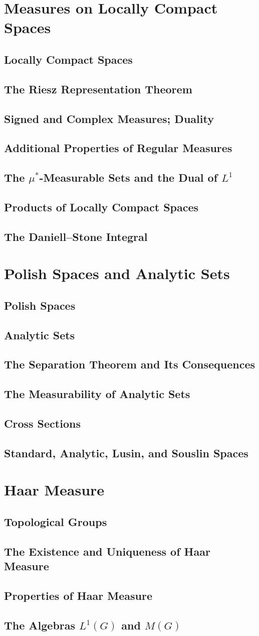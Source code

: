 \documentclass[11pt]{article}
\newcommand{\stubsection}[2][]{\section{#2}\if\relax\detokenize{#1}\relax\else\label{#1}\fi\mbox{}\par}
\newcommand{\stubsubsection}[2][]{\subsection{#2}\if\relax\detokenize{#1}\relax\else\label{#1}\fi\mbox{}\par}
\begin{document}
\stubsection[Section-7]{Measures on Locally Compact Spaces}

\stubsubsection{Locally Compact Spaces}

\stubsubsection{The Riesz Representation Theorem}

\stubsubsection{Signed and Complex Measures; Duality}

\stubsubsection{Additional Properties of Regular Measures}

\stubsubsection{\texorpdfstring{The $\mu^*$-Measurable Sets and the Dual of $L^1$}{The mu*-Measurable Sets and the Dual of L1}}

\stubsubsection{Products of Locally Compact Spaces}

\stubsubsection{The Daniell--Stone Integral}

\stubsection{Polish Spaces and Analytic Sets}

\stubsubsection{Polish Spaces}

\stubsubsection{Analytic Sets}

\stubsubsection{The Separation Theorem and Its Consequences}

\stubsubsection{The Measurability of Analytic Sets}

\stubsubsection{Cross Sections}

\stubsubsection{Standard, Analytic, Lusin, and Souslin Spaces}

\stubsection{Haar Measure}

\stubsubsection{Topological Groups}

\stubsubsection{The Existence and Uniqueness of Haar Measure}

\stubsubsection{Properties of Haar Measure}

\stubsubsection{\texorpdfstring{The Algebras $L^1(G)$ and $M(G)$}{The Algebras L1(G) and M(G)}}
\end{document}
